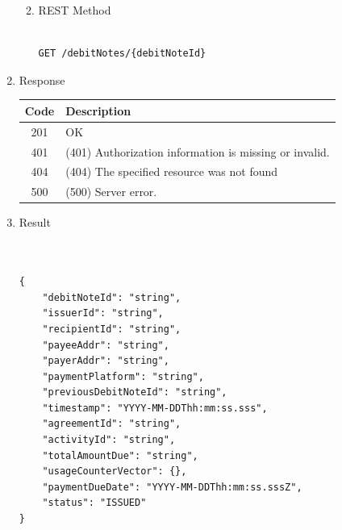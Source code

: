 \begin{enumerate}
\begin{enumerate}
\begin{table}[H]
\begin{center}
\begin{tabular}{|p{3cm}|l|p{3cm}|p{3cm}|p{4cm}|}
\end{tabular}
\end{center}
\end{table}


\item REST Method

\begin{tcolorbox}[boxrule=0pt, frame empty]
\begin{verbatim} 

GET /debitNotes/{debitNoteId}

\end{verbatim}
\end{tcolorbox}

\end{enumerate}

\item Response

\begin{table}[H]
\footnotesize

\begin{center}
\begin{tabular}{|c|l|} 
\hline
\rowcolor{lightgray}	Code 		& 	Description \\
\hline
201	 		&	OK \\
\hline
401			&	(401) Authorization information is missing or invalid. \\
\hline
404			&	(404) The specified resource was not found \\
\hline
500			&	(500) Server error. \\
\hline
\end{tabular}
\end{center}

\end{table}

\item Result

\begin{tcolorbox}[boxrule=0pt, frame empty]
\begin{verbatim}


{
	"debitNoteId": "string",
	"issuerId": "string",
	"recipientId": "string",
	"payeeAddr": "string",
	"payerAddr": "string",
	"paymentPlatform": "string",
	"previousDebitNoteId": "string",
	"timestamp": "YYYY-MM-DDThh:mm:ss.sss",
	"agreementId": "string",
	"activityId": "string",
	"totalAmountDue": "string",
	"usageCounterVector": {},
	"paymentDueDate": "YYYY-MM-DDThh:mm:ss.sssZ",
	"status": "ISSUED"
}


\end{verbatim}
\end{tcolorbox}


\end{enumerate}
